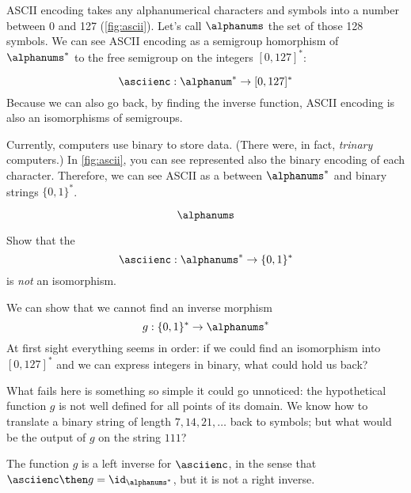 \begin{example}
    ASCII encoding takes any alphanumerical characters and symbols into a number between 0 and 127 (\cref{fig:ascii}).
    Let's call $\alphanums$ the set of those 128 symbols.
    We can see ASCII encoding as a semigroup homorphism of $\alphanums^*$ to the free semigroup on the integers $[0,127]^*$:

    \begin{equation} \label{eq:ASCII-semi}
    \asciienc: \alphanum^* \to  [0,127]^*
    \end{equation}
    Because we can also go back, by finding the inverse function, ASCII encoding is also an isomorphisms of semigroups.
\end{example}
\begin{example}
    Currently, computers use binary to store data. (There were, in fact, \emph{trinary} computers.)
    In \cref{fig:ascii}, you can see represented also the binary encoding of each character.
    Therefore, we can see ASCII as a \whomo between $\alphanums^*$ and binary strings $\{0,1\}^*$.
\end{example}

\begin{onlyforslides}
\begin{equation}
\alphanums \label{eq:alphanums}
\end{equation}
\end{onlyforslides}
\begin{exercise}
Show that the \whomo
\begin{equation}
\asciienc: \alphanums^* \to \{0,1\}^*
 \end{equation}
 is \emph{not} an isomorphism.
\end{exercise}
\begin{solution}
We can show that we cannot find an inverse morphism
 \begin{equation}
 g:  \{0,1\}^* \to \alphanums^*
 \end{equation}
 At first sight everything seems in order: if we could find an isomorphism into $[0,127]^*$ and
 we can express integers in binary, what could hold us back?

What fails here is something so simple it could go unnoticed: the hypothetical function $g$ is not well defined for all points of its domain. We know how to translate a binary string of length $7,14,21,\dots$ back to symbols; but what would be the output of $g$ on the string $111$?

The function $g$ is a left inverse for $\asciienc$, in the sense that
$\asciienc\then g = \id_{\alphanums^*}$, but it is not a right inverse.

\end{solution}

